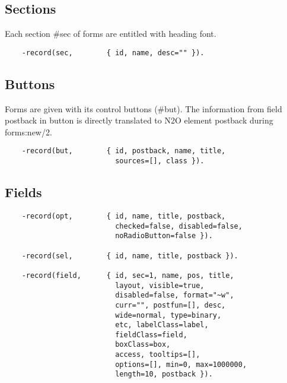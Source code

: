 \subsection{Sections}

Each section \#sec of forms are entitled with heading font.

\vspace{1\baselineskip}
\begin{lstlisting}
    -record(sec,        { id, name, desc="" }).
\end{lstlisting}
\vspace{1\baselineskip}

\subsection{Buttons}

Forms are given with its control buttons (\#but).
The information from field postback in button is directly translated
to N2O element postback during forms:new/2.

\vspace{1\baselineskip}
\begin{lstlisting}
    -record(but,        { id, postback, name, title,
                          sources=[], class }).
\end{lstlisting}
\vspace{1\baselineskip}

\newpage
\subsection{Fields}

\vspace{1\baselineskip}
\begin{lstlisting}
    -record(opt,        { id, name, title, postback,
                          checked=false, disabled=false,
                          noRadioButton=false }).

    -record(sel,        { id, name, title, postback }).

    -record(field,      { id, sec=1, name, pos, title,
                          layout, visible=true,
                          disabled=false, format="~w",
                          curr="", postfun=[], desc,
                          wide=normal, type=binary,
                          etc, labelClass=label,
                          fieldClass=field,
                          boxClass=box,
                          access, tooltips=[],
                          options=[], min=0, max=1000000,
                          length=10, postback }).
\end{lstlisting}
\vspace{1\baselineskip}


